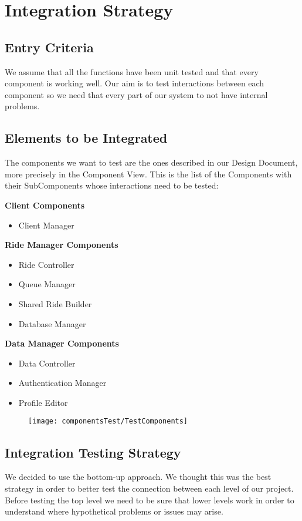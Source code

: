 \section{Integration Strategy}
\subsection{Entry Criteria}
We assume that all the functions have been unit tested and that every component is working well. Our aim is to test interactions between each component so we need that every part of our system to not have internal problems.
\subsection{Elements to be Integrated}
The components we want to test are the ones described in our Design Document, more precisely in the Component View.\newline
This is the list of the Components with their SubComponents whose interactions need to be tested: \newline
\newpage

\noindent\textbf{Client Components}
\begin{itemize}
\item Client Manager
\end{itemize}
\textbf{Ride Manager Components}
\begin{itemize}
\item Ride Controller
\item Queue Manager
\item Shared Ride Builder
\item Database Manager
\end {itemize}
\textbf{Data Manager Components}
\begin {itemize}
\item Data Controller
\item Authentication Manager
\item Profile Editor
\end{itemize}

\begin{figure}[h!]
  \centering
  \texttt{[image: componentsTest/TestComponents]}
\end{figure}

\subsection{Integration Testing Strategy}
We decided to use the bottom-up approach. We thought this was the best strategy in order to better test the connection between each level of our project.
Before testing the top level we need to be sure that lower levels work in order to understand where hypothetical problems or issues may arise.

